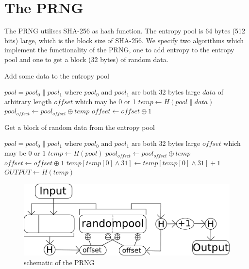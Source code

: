 \section{The PRNG}
The PRNG utilises SHA-256 as hash function.
The entropy pool is 64 bytes (512 bits) large, which is the block size of SHA-256.
We specify two algorithms which implement the functionality of the PRNG, one to add entropy to the entropy pool and one to get a block (32 bytes) of random data.
\begin{algorithm}
\caption{Add some data to the entropy pool}
\label{algAddEntropy}
\begin{algorithmic}
\REQUIRE $pool = pool_0 \parallel pool_1$ where $pool_0$ and $pool_1$ are both 32 bytes large
\REQUIRE $data$ of arbitrary length
\REQUIRE $offset$ which may be 0 or 1
\STATE $temp \leftarrow H(pool \parallel data)$
\STATE $pool_{offset} \leftarrow pool_{offset} \oplus temp$
\STATE $offset \leftarrow offset \oplus 1$
\end{algorithmic}
\end{algorithm}

\begin{algorithm}
\caption{Get a block of random data from the entropy pool}
\label{algGetRandom}
\begin{algorithmic}
\REQUIRE $pool = pool_0 \parallel pool_1$ where $pool_0$ and $pool_1$ are both 32 bytes large
\REQUIRE $offset$ which may be 0 or 1
\STATE $temp \leftarrow H(pool)$
\STATE $pool_{offset} \leftarrow pool_{offset} \oplus temp$
\STATE $offset \leftarrow offset \oplus 1$
\STATE $temp[temp[0] \wedge 31] \leftarrow temp[temp[0] \wedge 31] + 1$
\STATE $OUTPUT \leftarrow H(temp)$
\end{algorithmic}
\end{algorithm}

\begin{figure}
\includegraphics[scale=0.3]{PRNG} 
\caption{schematic of the PRNG}
\end{figure}
